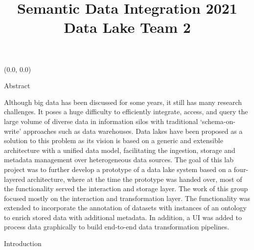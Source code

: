 \documentclass[12pt]{beamer}
\title{Semantic Data Integration 2021 \\ Data Lake Team 2}
\author{\hspace{1em}{\vphantom{Wy}Supervised by Prof. Dr. Christoph Quix and Dr. Christoph Lange-Bever}} %
\begin{document}
\begin{textblock}{0.5}(0.0, 0.0)

\begin{block}{Abstract}

\item Although big data has been discussed for some years, it still has many research challenges. It poses a huge difficulty to efficiently integrate, access, and query the large volume of diverse data in information silos with traditional ‘schema-on-write’ approaches such as data warehouses. Data lakes have been proposed as a solution to this problem as its vision is based on a generic and extensible architecture with a unified data model, facilitating the ingestion, storage and metadata management over heterogeneous data sources. The goal of this lab project was to further develop a prototype of a data lake system based on a four-layered architecture, where at the time the prototype was handed over, most of the functionality served the interaction and storage layer. The work of this group focused mostly on the interaction and transformation layer. The functionality was extended to incorporate the annotation of datasets with instances of an ontology to enrich stored data with additional metadata. In addition, a UI was added to process data graphically to build end-to-end data transformation pipelines.
\end{block}

\begin{block}{Introduction}


\end{block}
\end{textblock}
\end{document}
